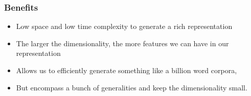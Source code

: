 \begin{frame}[fragile]\frametitle{Benefits}
  \begin{itemize}
    \item Low space and low time complexity to generate a rich representation
	\item The larger the dimensionality, the more features we can have in our representation
	\item Allows us to efficiently generate something like a billion word corpora, 
	\item But encompass a bunch of generalities and keep the dimensionality small.
  \end{itemize}

\end{frame}






